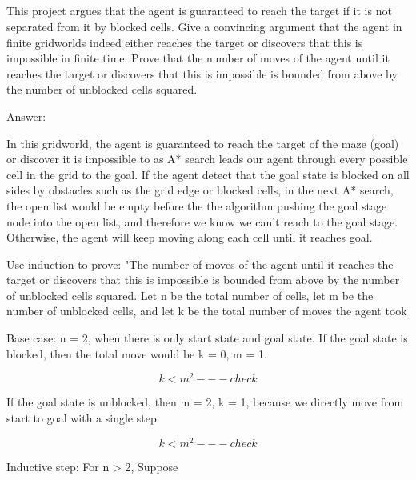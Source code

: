 \documentclass{article}
\begin{document}

\subsection{}

\begin{question}
	This project argues that the agent is guaranteed to reach the target if it is not separated from it by blocked cells. Give a
convincing argument that the agent in finite gridworlds indeed either reaches the target or discovers that this is impossible
in finite time. Prove that the number of moves of the agent until it reaches the target or discovers that this is impossible is
bounded from above by the number of unblocked cells squared.

\end{question}

Answer: \newline
\par In this gridworld, the agent is guaranteed to reach the target of the maze (goal) or discover it is impossible to as A* search leads our agent through every possible cell in the grid to the goal. If the agent detect that the goal state is blocked on all sides by obstacles such as the grid edge or blocked cells, in the next A* search, the open list would be empty before the the algorithm pushing the goal stage node into the open list, and therefore we know we can’t reach to the goal stage. Otherwise, the agent will keep moving along each cell until it reaches goal.

Use induction to prove: "The number of moves of the agent until it reaches the target or discovers that this is impossible is bounded from above by the number of unblocked cells squared. Let n be the total number of cells, let m be the number of unblocked cells, and let k be the
total number of moves the agent took

Base case: n = 2, when there is only start state and goal state. If the goal state is blocked,
then the total move would be k = 0, m = 1.

$$k < m^2  --- check$$

If the goal state is unblocked, then m = 2, k = 1, because we directly move from start to goal with a single step. 

$$k < m^2 --- check$$

Inductive step: For n > 2, Suppose 
\end{document}
